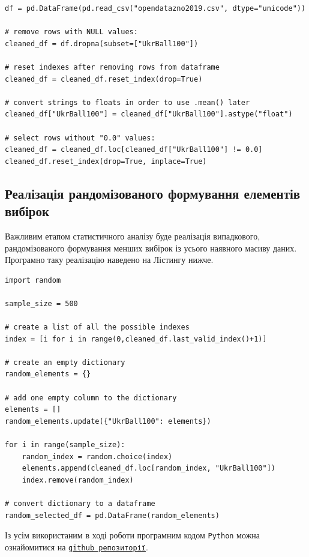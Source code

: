 \begin{lstlisting}[firstnumber=36, label = code: cleaning data, caption = Чистка даних]
df = pd.DataFrame(pd.read_csv("opendatazno2019.csv", dtype="unicode"))

# remove rows with NULL values:
cleaned_df = df.dropna(subset=["UkrBall100"])

# reset indexes after removing rows from dataframe
cleaned_df = cleaned_df.reset_index(drop=True)

# convert strings to floats in order to use .mean() later
cleaned_df["UkrBall100"] = cleaned_df["UkrBall100"].astype("float") 

# select rows without "0.0" values:
cleaned_df = cleaned_df.loc[cleaned_df["UkrBall100"] != 0.0]
cleaned_df.reset_index(drop=True, inplace=True)
\end{lstlisting}

\subsection*{Реалізація рандомізованого формування елементів вибірок}

Важливим етапом статистичного аналізу буде реалізація випадкового, рандомізованого формування менших вибірок із усього наявного масиву даних. Програмно таку реалізацію наведено на Лістингу нижче.

\begin{lstlisting}[firstnumber=51, label = code: randomization, caption = Рандомізоване формування вибірок]
import random

sample_size = 500

# create a list of all the possible indexes
index = [i for i in range(0,cleaned_df.last_valid_index()+1)]

# create an empty dictionary
random_elements = {}

# add one empty column to the dictionary
elements = []
random_elements.update({"UkrBall100": elements})

for i in range(sample_size):
    random_index = random.choice(index)
    elements.append(cleaned_df.loc[random_index, "UkrBall100"])
    index.remove(random_index)

# convert dictionary to a dataframe
random_selected_df = pd.DataFrame(random_elements)
\end{lstlisting}

\vspace{0.4cm}
Із усім використаним в ході роботи програмним кодом \texttt{Python} можна ознайомитися на  
\href{https://github.com/arroneq/ZNO-statistical-analysis.git}{\texttt{github репозиторії}}.